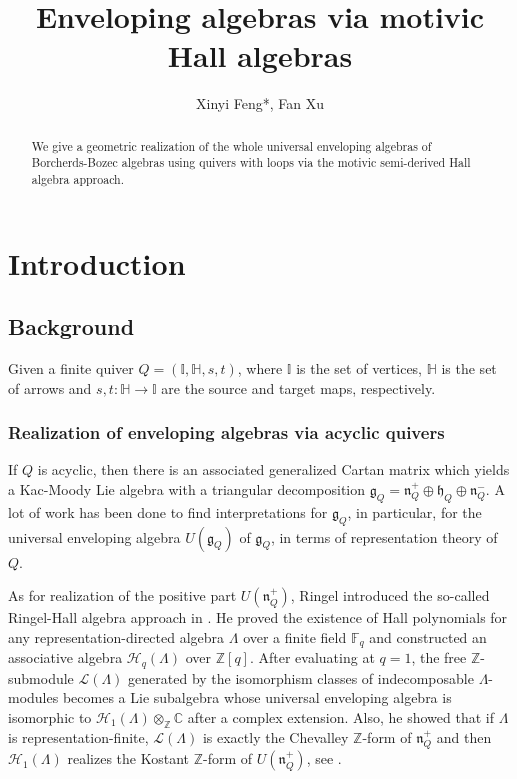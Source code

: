 \documentclass[12pt]{amsart}
\title{Enveloping algebras via motivic Hall algebras}
\author{Xinyi Feng*, Fan Xu}
\theoremstyle{definition}
\numberwithin{equation}{section}
\begin{document}
\begin{abstract}
   We give a geometric realization of the whole universal enveloping algebras of Borcherds-Bozec algebras using quivers with loops via the motivic semi-derived Hall algebra approach.       
\end{abstract}

\maketitle

\setcounter{tocdepth}{1}
\tableofcontents



\section{Introduction}

\subsection{Background}\;

Given a finite quiver $ Q=(\mathbb{I},\mathbb{H},s,t) $, where $ \mathbb{I} $ is the set of vertices, $ \mathbb{H} $ is the set of arrows and $ s,t:\mathbb{H} \to \mathbb{I} $ are the source and target maps, respectively. 

\subsubsection{Realization of enveloping algebras via acyclic quivers}\;

If $ Q $ is acyclic, then there is an associated generalized Cartan matrix which yields a Kac-Moody Lie algebra with a triangular decomposition $ \mathcal{\mathfrak{g}}_Q = \mathfrak{n}_Q^+ \oplus \mathfrak{h}_Q \oplus \mathfrak{n}_Q^- $.  
A lot of work has been done to find interpretations for $ \mathfrak{g}_Q $, in particular, for the universal enveloping algebra $ U(\mathfrak{g}_Q)  $ of $ \mathfrak{g}_Q $, in terms of representation theory of $ Q $. 

As for realization of the positive part $ U(\mathfrak{n}_Q^+) $, Ringel introduced the so-called Ringel-Hall algebra approach in \cite{R3,R5}. 
He proved the existence of Hall polynomials for any representation-directed algebra $ \Lambda $ over a finite field $ \mathbb{F}_q $ and constructed an associative algebra  $ \mathcal{H}_q(\Lambda) $ over $ \mathbb{Z}[q] $. 
After evaluating at $ q=1 $, the free $ \mathbb{Z} $-submodule $ \mathcal{L}(\Lambda) $ generated by the isomorphism classes of indecomposable $ \Lambda $-modules becomes a Lie subalgebra whose universal enveloping algebra is isomorphic to $ \mathcal{H}_1(\Lambda) \otimes_{\mathbb{Z}} \mathbb{C} $ after a complex extension.      
Also, he showed that if $ \Lambda $ is representation-finite, $ \mathcal{L}(\Lambda) $ is exactly the Chevalley $\mathbb{Z}$-form of $ \mathfrak{n}^+_Q $ and then $ \mathcal{H}_1(\Lambda) $ realizes the Kostant $ \mathbb{Z} $-form of $ U(\mathfrak{n}^+_Q) $, see \cite{R4}. 
\end{document}
